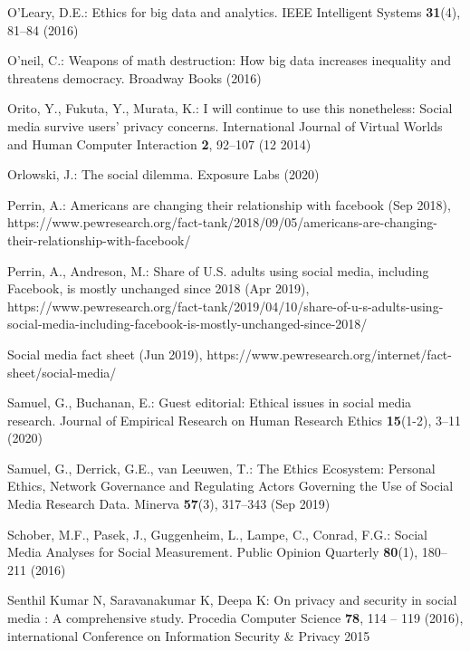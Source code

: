 \documentclass[11pt]{article} %
\begin{document}
\begin{thebibliography}{10}
\begin{small}
{O'Leary}, D.E.: Ethics for big data and analytics. IEEE Intelligent Systems
  \textbf{31}(4),  81--84 (2016)

O'neil, C.: Weapons of math destruction: How big data increases inequality and
  threatens democracy. Broadway Books (2016)

Orito, Y., Fukuta, Y., Murata, K.: I will continue to use this nonetheless:
  Social media survive users' privacy concerns. International Journal of
  Virtual Worlds and Human Computer Interaction  \textbf{2},  92--107 (12 2014)

Orlowski, J.: The social dilemma. Exposure Labs (2020)

Perrin, A.: Americans are changing their relationship with facebook (Sep 2018),
  https://www.pewresearch.org/fact-tank/2018/09/05/americans-are-changing-their-relationship-with-facebook/

Perrin, A., Andreson, M.: Share of {U}.{S}. adults using social media,
  including {Facebook}, is mostly unchanged since 2018 (Apr 2019),
  https://www.pewresearch.org/fact-tank/2019/04/10/share-of-u-s-adults-using-social-media-including-facebook-is-mostly-unchanged-since-2018/

Social media fact sheet (Jun 2019),
  https://www.pewresearch.org/internet/fact-sheet/social-media/

Samuel, G., Buchanan, E.: Guest editorial: Ethical issues in social media
  research. Journal of Empirical Research on Human Research Ethics
  \textbf{15}(1-2),  3--11 (2020)

Samuel, G., Derrick, G.E., van Leeuwen, T.: The {Ethics} {Ecosystem}:
  {Personal} {Ethics}, {Network} {Governance} and {Regulating} {Actors}
  {Governing} the {Use} of {Social} {Media} {Research} {Data}. Minerva
  \textbf{57}(3),  317--343 (Sep 2019)

Schober, M.F., Pasek, J., Guggenheim, L., Lampe, C., Conrad, F.G.: Social
  {Media} {Analyses} for {Social} {Measurement}. Public Opinion Quarterly
  \textbf{80}(1),  180--211 (2016)

{Senthil Kumar N}, {Saravanakumar K}, {Deepa K}: On privacy and security in
  social media : A comprehensive study. Procedia Computer Science  \textbf{78},
   114 -- 119 (2016), international Conference on Information Security \&
  Privacy 2015


\end{small}
\end{thebibliography}
\end{document}
